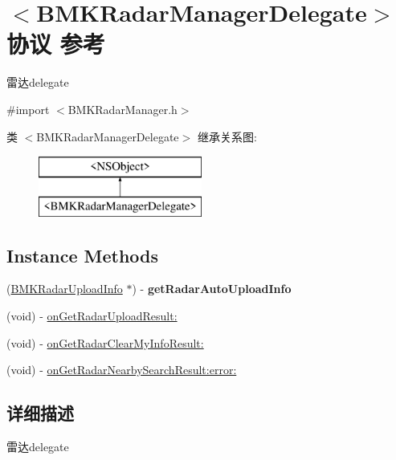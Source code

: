 \hypertarget{protocol_b_m_k_radar_manager_delegate-p}{}\section{$<$B\+M\+K\+Radar\+Manager\+Delegate$>$协议 参考}
\label{protocol_b_m_k_radar_manager_delegate-p}


雷达delegate  




{\ttfamily \#import $<$B\+M\+K\+Radar\+Manager.\+h$>$}

类 $<$B\+M\+K\+Radar\+Manager\+Delegate$>$ 继承关系图\+:\begin{figure}[H]
\begin{center}
\leavevmode
\includegraphics[height=2.000000cm]{protocol_b_m_k_radar_manager_delegate-p}
\end{center}
\end{figure}
\subsection*{Instance Methods}
\begin{DoxyCompactItemize}
\item 
\hypertarget{protocol_b_m_k_radar_manager_delegate-p_a766c634d7b4dd2cba0364851f785161a}{}(\hyperlink{interface_b_m_k_radar_upload_info}{B\+M\+K\+Radar\+Upload\+Info} $\ast$) -\/ {\bfseries get\+Radar\+Auto\+Upload\+Info}\label{protocol_b_m_k_radar_manager_delegate-p_a766c634d7b4dd2cba0364851f785161a}

\item 
(void) -\/ \hyperlink{protocol_b_m_k_radar_manager_delegate-p_adccea74fc80820223eccfd9ad9384a59}{on\+Get\+Radar\+Upload\+Result\+:}
\item 
(void) -\/ \hyperlink{protocol_b_m_k_radar_manager_delegate-p_ab5fddaa20a0f6c6e59e6bd78b51037ac}{on\+Get\+Radar\+Clear\+My\+Info\+Result\+:}
\item 
(void) -\/ \hyperlink{protocol_b_m_k_radar_manager_delegate-p_a1721eff2d9f2407dede1dac2b2afc379}{on\+Get\+Radar\+Nearby\+Search\+Result\+:error\+:}
\end{DoxyCompactItemize}


\subsection{详细描述}
雷达delegate 

